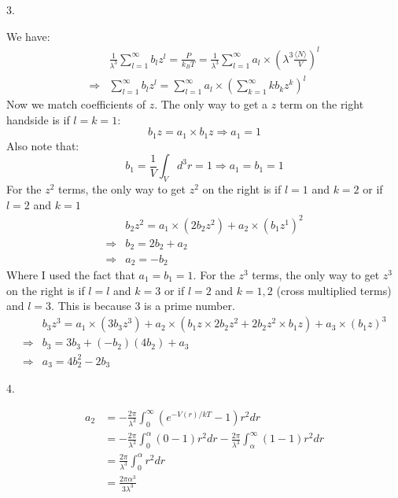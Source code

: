 \documentclass[a4paper,12pt]{article}
\begin{document}
3.
\begin{minipage}[t]{0.9\textwidth}
  We have:
  \begin{align*}
                & \frac{1}{\lambda^3} \sum_{l=1}^\infty b_l z^l = \frac{P}{k_BT} = \frac{1}{\lambda^3} \sum_{l =1}^\infty a_l \times \left(\lambda^3 \frac{\langle N\rangle}{V} \right)^l\\
    \Rightarrow & \sum_{l=1}^\infty b_l z^l =\sum_{l =1}^\infty a_l \times \left(\sum_{k=1}^\infty k b_k z^k\right)^l
  \end{align*}
  Now we match coefficients of $z$. The only way to get a $z$ term on the right handside is if $l = k = 1$:
  \begin{equation*}
    b_1z = a_1 \times b_1 z \Rightarrow a_1 = 1
  \end{equation*}
  Also note that:
  \begin{equation*}
    b_1 = \frac{1}{V}\int_Vd^3r = 1 \Rightarrow a_1=b_1 = 1
  \end{equation*}
  For the $z^2$ terms, the only way to get $z^2$ on the right is if $l = 1$ and $k = 2$ or if $l = 2$ and $k = 1$
  \begin{align*}
                & b_2z^2 = a_1 \times (2 b_2 z^2) + a_2 \times (b_1 z^1)^2\\
    \Rightarrow & b_2 = 2 b_2 + a_2 \\
    \Rightarrow & a_2 = - b_2
  \end{align*}
  Where I used the fact that $a_1 = b_1 = 1$.
  For the $z^3$ terms, the only way to get $z^3$ on the right is if $l = l$ and $k = 3$ or if $l = 2$ and $k = 1, 2$ (cross multiplied terms) and $l = 3$. This is because $3$ is a prime number.
  \begin{align*}
                & b_3z^3 = a_1 \times (3 b_3 z^3) + a_2 \times (b_1 z \times 2 b_2 z^2 + 2 b_2 z^2 \times b_1 z) + a_3 \times (b_1 z)^3\\
    \Rightarrow & b_3 = 3 b_3 + (-b_2)(4 b_2) + a_3\\
    \Rightarrow & a_3 = 4 b_2^2 - 2 b_3
  \end{align*}
\end{minipage}

4.
\begin{minipage}[t]{0.9\textwidth}
  \begin{align*}
    a_2 &= -\frac{2 \pi}{\lambda^3} \int_0^\infty(e^{-V(r) / kT} - 1)r^2dr\\
        &= -\frac{2 \pi}{\lambda^3} \int_0^\alpha(0 - 1)r^2dr -\frac{2 \pi}{\lambda^3}\int_\alpha^\infty(1 - 1)r^2dr\\
        &= \frac{2 \pi}{\lambda^3} \int_0^\alpha r^2dr\\
        &= \frac{2 \pi \alpha^3}{3\lambda^3}
  \end{align*}
\end{minipage}
\end{document}
